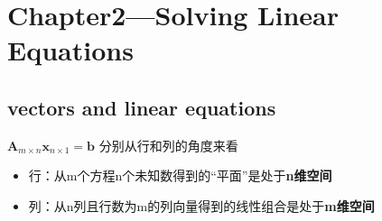 \documentclass[UTF8]{article}
\begin{document}
    \section{Chapter2---Solving Linear Equations}
    \subsection{vectors and linear equations}
    $\bm{A}_{m\times n}\bm{x}_{n \times 1}=\bm{b}$ 分别从行和列的角度来看
    \begin{itemize}
        \item 行：从m个方程n个未知数得到的“平面”是处于\textbf{n维空间}
        \item 列：从n列且行数为m的列向量得到的线性组合是处于\textbf{m维空间}
    \end{itemize}
\end{document}
